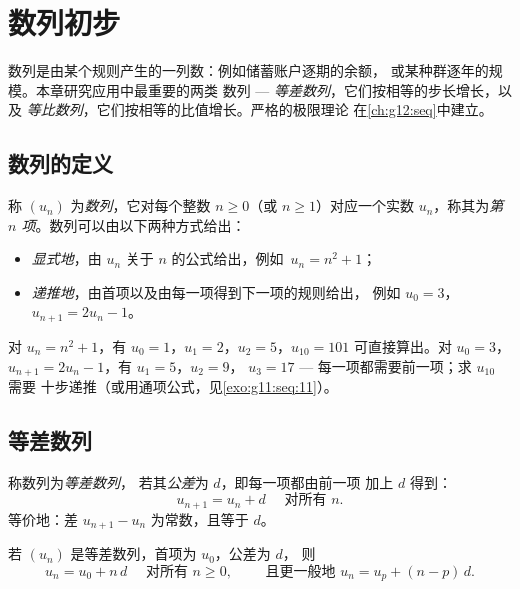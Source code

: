 \chapter{数列初步}\label{ch:g11:seq}

数列是由某个规则产生的一列数：例如储蓄账户逐期的余额，
或某种群逐年的规模。本章研究应用中最重要的两类
数列 ---
\emph{等差数列}，它们按相等的步长增长，以及
\emph{等比数列}，它们按相等的比值增长。严格的极限理论
在\cref{ch:g12:seq}中建立。

\section{数列的定义}

\begin{definition}[数列]\label{def:g11:seq:sequence}
称 $(u_n)$ 为\emph{数列}，它对每个整数
$n \geq 0$（或 $n \geq 1$）对应一个实数 $u_n$，称其为\emph{第
$n$ 项}。数列可以由以下两种方式给出：
\begin{itemize}
  \item \emph{显式地}，由 $u_n$ 关于 $n$ 的公式给出，例如\
        $u_n = n^2 + 1$；
  \item \emph{递推地}，由首项以及由每一项得到下一项的规则给出，
        例如 $u_0 = 3$，$u_{n+1} = 2u_n - 1$。
\end{itemize}
\end{definition}

\begin{example}
对 $u_n = n^2 + 1$，有 $u_0 = 1$，$u_1 = 2$，$u_2 = 5$，$u_{10} = 101$
可直接算出。对 $u_0 = 3$，$u_{n+1} = 2u_n - 1$，有 $u_1 = 5$，$u_2 = 9$，
$u_3 = 17$ --- 每一项都需要前一项；求 $u_{10}$ 需要
十步递推（或用通项公式，见\cref{exo:g11:seq:11}）。
\end{example}

\section{等差数列}

\begin{definition}[等差数列]\label{def:g11:seq:arithmetic}
称数列为\emph{等差数列}，
若其\emph{公差}为 $d$，即每一项都由前一项
加上 $d$ 得到：
\[
u_{n+1} = u_n + d \quad \text{ 对所有 } n.
\]
等价地：差 $u_{n+1} - u_n$ 为常数，且等于 $d$。
\end{definition}

\begin{theorem}[通项公式]\label{thm:g11:seq:arithgeneral}
若 $(u_n)$ 是等差数列，首项为 $u_0$，公差为 $d$，
则
\[
u_n = u_0 + n\,d \quad \text{ 对所有 } n \geq 0,
\qquad\text{ 且更一般地 } u_n = u_p + (n - p)\,d .
\]
\end{theorem}

